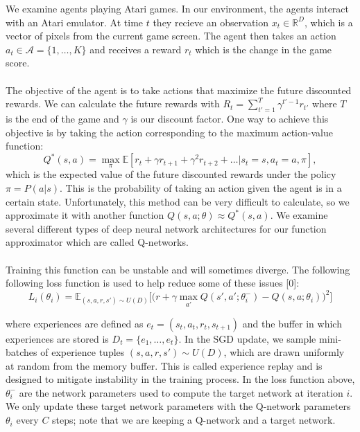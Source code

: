 \documentclass{article}
\begin{document}
We examine agents playing Atari games. In our environment, the agents interact with
an Atari emulator. At time $t$ they recieve an observation $x_t \in \mathbb{R}^D$,
which is a vector of pixels from the current game screen. The agent then takes an
action $a_t \in \mathcal{A} = \{1, \dots, K\}$ and receives a reward $r_t$ which
is the change in the game score. \\
\\
The objective of the agent is to take actions that maximize the future discounted
rewards. We can calculate the future rewards with $R_t = \sum_{t' = 1}^T \gamma^{t'-1}r_{t'}$
where $T$ is the end of the game and $\gamma$ is our discount factor. One way
to achieve this objective is by taking the action corresponding to the maximum
action-value function:
$$Q^*(s,a) = \max_{\pi}\mathbb{E}[r_t + \gamma r_{t+1} + \gamma^2 r_{t+2} + \dots
|s_t = s, a_t = a, \pi],$$
which is the expected value of the future discounted rewards under the policy
$\pi = P(a|s)$. This is the probability of taking an action given the agent is in a
certain state. Unfortunately, this method can be very difficult to calculate,
so we approximate it with another function $Q(s,a;\theta) \approx Q^*(s,a)$. We
examine several different types of deep neural network architectures for our
function approximator which are called Q-networks. \\
\\
Training this function can be unstable and will sometimes diverge. The following
following loss function is used to help reduce some of these issues [0]:
\begin{equation}
    L_i(\theta_i) = \mathbb{E}_{(s,a,r,s') \sim U(D)}\Big[\Big(
    r + \gamma \max_{a'}Q(s',a';\theta_i^-) - Q(s,a;\theta_i)\Big)^2\Big]
\end{equation}

where experiences are defined as $e_t = (s_t, a_t, r_t, s_{t+1})$ and the buffer
in which experiences are stored is $D_t = \{e_1, \dots, e_t\}$. In the SGD update,
we sample mini-batches of experience tuples $(s, a, r, s') \sim U(D)$, which are
drawn uniformly at random from the memory buffer. This is called experience replay
and is designed to mitigate instability in the training process. In the loss
function above, $\theta_i^-$ are the network parameters used to compute the target
network at iteration $i$. We only update these target network parameters with
the Q-network parameters $\theta_i$ every $C$ steps; note that we are keeping a
Q-network and a target network.
\end{document}
